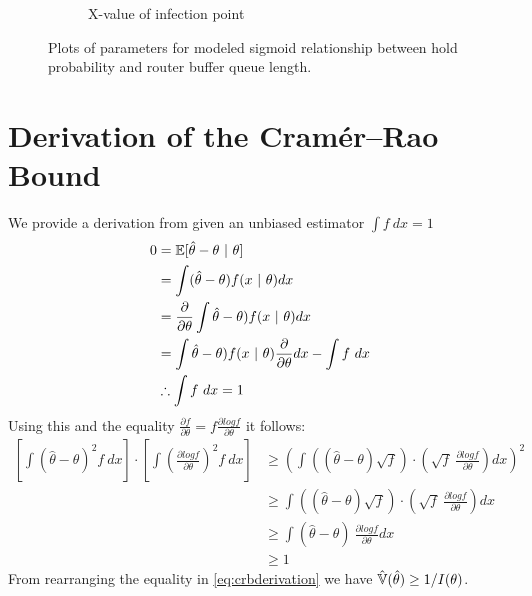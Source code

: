 \begin{figure}[H]
\begin{subfigure}{0.475\textwidth}
            \caption{X-value of infection point}
        \end{subfigure}
        \caption{Plots of parameters for modeled sigmoid relationship between hold probability and router buffer queue length.}
        \label{fig:Rsigmoidcoefs}
    \end{figure}
    
\section{Derivation of the Cramér–Rao Bound}
We provide a derivation from \cite{trees_detection_2013} given an unbiased estimator $\int f\ dx=1$ 
\begin{align*}
    0 &= \EX[\hat\theta - \theta\ |\ \theta]\\
    &= \int (\hat\theta - \theta) f(x\ |\ \theta)dx\\
    &= \frac{\partial}{\partial\theta}\int \hat\theta - \theta) f(x\ |\ \theta)dx\\
    &= \int \hat\theta - \theta) f(x\ |\ \theta)\frac{\partial}{\partial\theta}dx-\int f\ dx\\
    &\therefore \int f\ dx = 1
\end{align*}
Using this and the equality $\frac{\partial f}{\partial\theta} = f\frac{\partial log f}{\partial\theta}$ it follows:
\begin{equation}\label{eq:crbderivation}
\begin{aligned}
    \left[\int(\hat\theta -\theta)^2 f\ dx\right]\cdot
    \left[\int\left(\frac{\partial logf}{\partial\theta}\right)^2 f\ dx\right] &\geq
    \left(\int((\hat\theta-\theta)\sqrt{f})\cdot
    \left(\sqrt{f}\ \frac{\partial logf}{\partial\theta}\right) dx\right)^2\\
    & \geq \int((\hat\theta-\theta)\sqrt{f})\cdot\left(\sqrt{f}\ \frac{\partial logf}{\partial\theta}\right) dx\\
    & \geq \int(\hat\theta-\theta)\ \frac{\partial logf}{\partial\theta}dx\\
    & \geq 1
\end{aligned}
\end{equation}
From rearranging the equality in \cref{eq:crbderivation} we have $\operatorname{\hat{\mathbb{V}}}(\hat\theta) \geq 1/I(\theta)$.